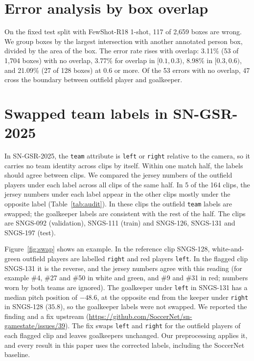 \documentclass[10pt]{article}
\begin{document}
\section{Error analysis by box overlap}
\label{sec:errors}

On the fixed test split with FewShot-R18 1-shot, 117 of 2,659 boxes are wrong. We group boxes by the largest intersection with another annotated person box, divided by the area of the box. The error rate rises with overlap: 3.11\% (53 of 1,704 boxes) with no overlap, 3.77\% for overlap in $[0.1,0.3)$, 8.98\% in $[0.3,0.6)$, and 21.09\% (27 of 128 boxes) at 0.6 or more. Of the 53 errors with no overlap, 47 cross the boundary between outfield player and goalkeeper.



\section{Swapped team labels in SN-GSR-2025}
\label{sec:audit}

In SN-GSR-2025, the \texttt{team} attribute is \texttt{left} or \texttt{right} relative to the camera, so it carries no team identity across clips by itself. Within one match half, the labels should agree between clips. We compared the jersey numbers of the outfield players under each label across all clips of the same half. In 5 of the 164 clips, the jersey numbers under each label appear in the other clips mostly under the opposite label (Table~\ref{tab:audit}). In these clips the outfield \texttt{team} labels are swapped; the goalkeeper labels are consistent with the rest of the half. The clips are SNGS-092 (validation), SNGS-111 (train) and SNGS-126, SNGS-131 and SNGS-197 (test).

Figure~\ref{fig:swap} shows an example. In the reference clip SNGS-128, white-and-green outfield players are labelled \texttt{right} and red players \texttt{left}. In the flagged clip SNGS-131 it is the reverse, and the jersey numbers agree with this reading (for example \#4, \#27 and \#50 in white and green, and \#9 and \#31 in red; numbers worn by both teams are ignored). The goalkeeper under \texttt{left} in SNGS-131 has a median pitch position of $-48.6$, at the opposite end from the keeper under \texttt{right} in SNGS-128 ($35.8$), so the goalkeeper labels were not swapped. We reported the finding and a fix upstream (\url{https://github.com/SoccerNet/sn-gamestate/issues/39}). The fix swaps \texttt{left} and \texttt{right} for the outfield players of each flagged clip and leaves goalkeepers unchanged. Our preprocessing applies it, and every result in this paper uses the corrected labels, including the SoccerNet baseline.
\end{document}
